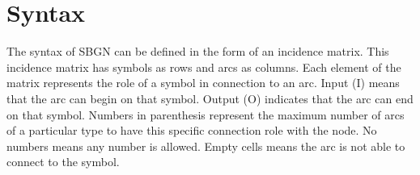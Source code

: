 \color{red}
\section{Syntax}


The syntax of SBGN \ERs can be defined in the form of an incidence matrix. This incidence matrix has symbols as rows and arcs as columns. Each element of the matrix represents the role of a symbol in connection to an arc. Input (I) means that the arc can begin on that symbol. Output (O) indicates that the arc can end on that symbol. Numbers in parenthesis represent the maximum number of arcs of a particular type to have this specific connection role with the node. No numbers means any number is allowed. Empty cells means the arc is not able to connect to the symbol. 

